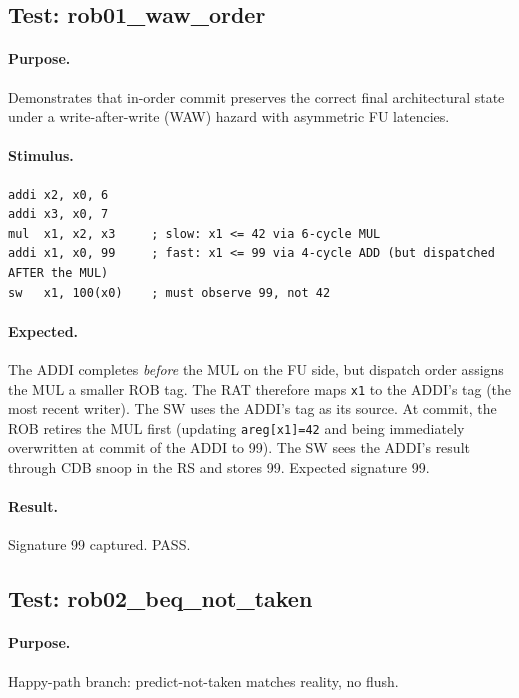 \documentclass[11pt]{article}
\begin{document}
\subsection{Test: rob01\_waw\_order}

\paragraph{Purpose.}
Demonstrates that in-order commit preserves the correct
final architectural state under a write-after-write (WAW) hazard with
asymmetric FU latencies.

\paragraph{Stimulus.}
\begin{lstlisting}[style=verilog, caption=WAW ordering (rob01\_waw\_order.s)]
addi x2, x0, 6
addi x3, x0, 7
mul  x1, x2, x3     ; slow: x1 <= 42 via 6-cycle MUL
addi x1, x0, 99     ; fast: x1 <= 99 via 4-cycle ADD (but dispatched AFTER the MUL)
sw   x1, 100(x0)    ; must observe 99, not 42
\end{lstlisting}

\paragraph{Expected.}
The ADDI completes \emph{before} the MUL on the FU side, but dispatch order
assigns the MUL a smaller ROB tag. The RAT therefore maps \texttt{x1} to the
ADDI's tag (the most recent writer). The SW uses the ADDI's tag as its source.
At commit, the ROB retires the MUL first (updating \texttt{areg[x1]=42} and
being immediately overwritten at commit of the ADDI to 99). The SW sees the
ADDI's result through CDB snoop in the RS and stores 99. Expected signature
99.

\paragraph{Result.} Signature 99 captured. PASS.

\subsection{Test: rob02\_beq\_not\_taken}

\paragraph{Purpose.}
Happy-path branch: predict-not-taken matches reality, no flush.
\end{document}
